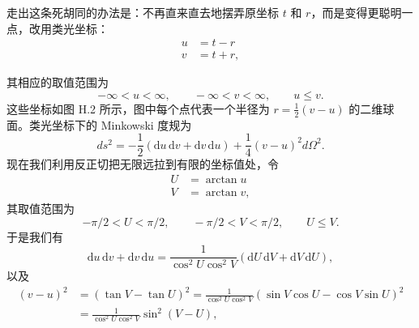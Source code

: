 走出这条死胡同的办法是：不再直来直去地摆弄原坐标 $t$ 和 $r$，而是变得更聪明一点，改用类光坐标：
\begin{equation*}
\begin{aligned}
u &= t - r \\
v &= t + r,
\end{aligned}
\tag{H.5}
\end{equation*}



其相应的取值范围为
\begin{equation*}
-\infty < u < \infty, \qquad -\infty < v < \infty, \qquad u \le v.
\tag{H.6}
\end{equation*}
这些坐标如图 H.2 所示，图中每个点代表一个半径为 $r = \frac{1}{2}(v-u)$ 的二维球面。类光坐标下的 Minkowski 度规为
\begin{equation*}
ds^{2} = -\frac{1}{2}(\mathrm{d}u\,\mathrm{d}v + \mathrm{d}v\,\mathrm{d}u) + \frac{1}{4}(v-u)^{2}d\Omega^{2}.
\tag{H.7}
\end{equation*}
现在我们利用反正切把无限远拉到有限的坐标值处，令
\begin{equation*}
\begin{aligned}
U &= \arctan u \\
V &= \arctan v,
\end{aligned}
\tag{H.8}
\end{equation*}
其取值范围为
\begin{equation*}
-\pi/2 < U < \pi/2, \qquad -\pi/2 < V < \pi/2, \qquad U \le V.
\tag{H.9}
\end{equation*}
于是我们有
\begin{equation*}
\mathrm{d}u\,\mathrm{d}v + \mathrm{d}v\,\mathrm{d}u = \frac{1}{\cos^{2}U\cos^{2}V}(\mathrm{d}U\,\mathrm{d}V + \mathrm{d}V\,\mathrm{d}U),
\tag{H.10}
\end{equation*}
以及
\begin{align*}
(v-u)^{2} &= (\tan V - \tan U)^{2} = \frac{1}{\cos^{2}U\cos^{2}V}\left(\sin V\cos U - \cos V\sin U\right)^{2} \\
&= \frac{1}{\cos^{2}U\cos^{2}V}\sin^{2}(V-U),
\tag{H.11}
\end{align*}

